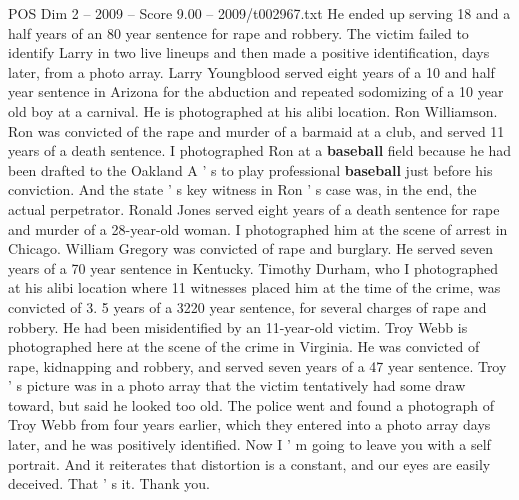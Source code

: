 \begin{textsample}{POS Dim 2 – 2009 – Score 9.00 – 2009/t002967.txt}
He ended up serving 18 and a half years of an 80 year sentence for rape and robbery.
The victim failed to identify Larry in two live lineups and then made a positive identification, days later, from a photo array.
Larry Youngblood served eight years of a 10 and half year sentence in Arizona for the abduction and repeated sodomizing of a 10 year old boy at a carnival.
He is photographed at his alibi location.
Ron Williamson.
Ron was convicted of the rape and murder of a barmaid at a club, and served 11 years of a death sentence.
I photographed Ron at a \textbf{baseball} field because he had been drafted to the Oakland A ' s to play professional \textbf{baseball} just before his conviction.
And the state ' s key witness in Ron ' s case was, in the end, the actual perpetrator.
Ronald Jones served eight years of a death sentence for rape and murder of a 28-year-old woman.
I photographed him at the scene of arrest in Chicago.
William Gregory was convicted of rape and burglary.
He served seven years of a 70 year sentence in Kentucky.
Timothy Durham, who I photographed at his alibi location where 11 witnesses placed him at the time of the crime, was convicted of 3. 5 years of a 3220 year sentence, for several charges of rape and robbery.
He had been misidentified by an 11-year-old victim.
Troy Webb is photographed here at the scene of the crime in Virginia.
He was convicted of rape, kidnapping and robbery, and served seven years of a 47 year sentence.
Troy ' s picture was in a photo array that the victim tentatively had some draw toward, but said he looked too old.
The police went and found a photograph of Troy Webb from four years earlier, which they entered into a photo array days later, and he was positively identified.
Now I ' m going to leave you with a self portrait.
And it reiterates that distortion is a constant, and our eyes are easily deceived.
That ' s it.
Thank you.

\end{textsample}
